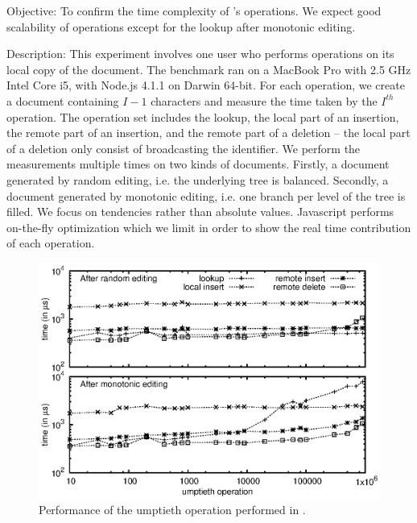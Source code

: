 \begin{asparadesc}
\item [Objective:] To confirm the time complexity of \LSEQ's operations. We
  expect good scalability of operations except for the lookup after monotonic
  editing.
\item [Description:] This experiment involves one user who performs operations
  on its local copy of the document. The benchmark ran on a MacBook Pro with 2.5
  GHz Intel Core i5, with Node.js 4.1.1 on Darwin 64-bit. For each operation, we
  create a document containing $I-1$ characters and measure the time taken by
  the $I^{th}$ operation. The operation set includes the lookup, the local part
  of an insertion, the remote part of an insertion, and the remote part of a
  deletion -- the local part of a deletion only consist of broadcasting the
  identifier. We perform the measurements multiple times on two kinds of
  documents. Firstly, a document generated by random editing, i.e. the
  underlying \LSEQ tree is balanced. Secondly, a document generated by monotonic
  editing, i.e. one branch per level of the \LSEQ tree is filled.  We focus on
  tendencies rather than absolute values. Javascript performs on-the-fly
  optimization which we limit in order to show the real time contribution of
  each operation.

\begin{figure}
  \centering
  \includegraphics[width=\columnwidth]{./img/time.eps}
  \caption{\label{fig:time} Performance of the umptieth operation performed in
    \LSEQ.}
\end{figure}


\end{asparadesc}
